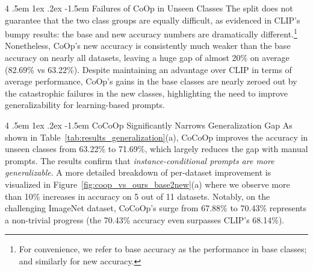 \documentclass[10pt,twocolumn,letterpaper]{article}
\makeatletter
\renewcommand\paragraph{
  \@startsection{paragraph} %
  {4} %
  {\z@} %
  {.5em \@plus1ex \@minus.2ex} %
  {-1.5em} %
  {\normalfont\normalsize\bfseries} %
}
\makeatother
\begin{document}
\paragraph{Failures of CoOp in Unseen Classes}
The split does not guarantee that the two class groups are equally difficult, as evidenced in CLIP's bumpy results: the base and new accuracy numbers are dramatically different.\footnote{For convenience, we refer to base accuracy as the performance in base classes; and similarly for new accuracy.} Nonetheless, CoOp's new accuracy is consistently much weaker than the base accuracy on nearly all datasets, leaving a huge gap of almost 20\% on average (82.69\% vs 63.22\%). Despite maintaining an advantage over CLIP in terms of average performance, CoOp's gains in the base classes are nearly zeroed out by the catastrophic failures in the new classes, highlighting the need to improve generalizability for learning-based prompts.

\paragraph{CoCoOp Significantly Narrows Generalization Gap}
As shown in Table~\ref{tab:results_generalization}(a), CoCoOp improves the accuracy in unseen classes from 63.22\% to 71.69\%, which largely reduces the gap with manual prompts. The results confirm that \emph{instance-conditional prompts are more generalizable}. A more detailed breakdown of per-dataset improvement is visualized in Figure~\ref{fig:coop_vs_ours_base2new}(a) where we observe more than 10\% increases in accuracy on 5 out of 11 datasets. Notably, on the challenging ImageNet dataset, CoCoOp's surge from 67.88\% to 70.43\% represents a non-trivial progress (the 70.43\% accuracy even surpasses CLIP's 68.14\%).
\end{document}
